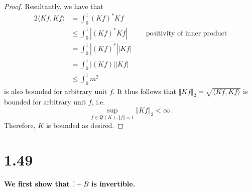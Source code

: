 \documentclass[10pt]{article}
\begin{document}
\begin{proof}
    Resultantly, we have that
    \begin{alignat*}{2}
        \langle Kf, Kf\rangle &= \int_{0}^{1} (Kf)^* Kf\\
        &\le \int_{0}^{1} |(Kf)^* Kf| \quad &&\text{positivity of inner product}\\
        &= \int_{0}^{1} |(Kf)^*|| Kf|\\
        &= \int_{0}^{1} |(Kf)|| Kf|\\
        &\le \int_{0}^{1} m^2
    \end{alignat*}
    is also bounded for arbitrary unit $f.$
    It thus follows that $\Vert Kf \Vert_2 = \sqrt{\langle Kf, Kf\rangle}$ is bounded for arbitrary unit $f$, i.e.
    \[\sup_{f\in\mathfrak{D}(K), \Vert f \Vert = 1} \Vert Kf \Vert_2 < \infty.\]
    Therefore, $K$ is bounded as desired.
\end{proof}

\section*{1.49}

\textbf{We first show that $\mathbb{I} + B$ is invertible.}
\end{document}
